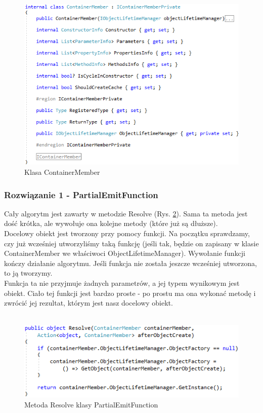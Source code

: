 \documentclass[12pt]{article}
\begin{document}
\begin{figure}[H]
	\begin{center}
  		\includegraphics{ContainerMember.png}
  		\caption{Klasa ContainerMember}
  		\label{fig:ContainerMember}
	\end{center}
\end{figure}

\subsubsection{Rozwiązanie 1 - PartialEmitFunction}
Cały algorytm jest zawarty w metodzie Resolve (Rys. \ref{fig:PartialEmitFunction_Resolve}). Sama ta metoda jest dość krótka, ale wywołuje ona kolejne metody (które już są dłuższe).\\
Docelowy obiekt jest tworzony przy pomocy funkcji. Na początku sprawdzamy, czy już wcześniej utworzyliśmy taką funkcję (jeśli tak, będzie on zapisany w klasie ContainerMember we właściwoci ObjectLifetimeManager). Wywołanie funkcji kończy działanie algorytmu. Jeśli funkcja nie została jeszcze wcześniej utworzona, to ją tworzymy.\\
Funkcja ta nie przyjmuje żadnych parametrów, a jej typem wynikowym jest obiekt. Ciało tej funkcji jest bardzo proste - po prostu ma ona wykonać metodę i zwrócić jej rezultat, którym jest nasz docelowy obiekt.\\ \\
\begin{figure}[H]
	\begin{center}
  		\includegraphics{PartialEmitFunction_Resolve.png}
  		\caption{Metoda Resolve klasy PartialEmitFunction}
  		\label{fig:PartialEmitFunction_Resolve}
	\end{center}
\end{figure}
\end{document}
